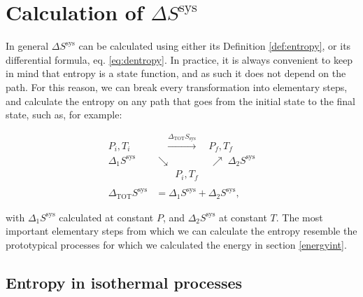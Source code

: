 \documentclass[
  9pt,
]{extbook}
\theoremstyle{definition}
\theoremstyle{definition}
\theoremstyle{definition}
\theoremstyle{remark}
\begin{document}
\hypertarget{dssys}{%
\section{\texorpdfstring{Calculation of \(\Delta S^{\mathrm{sys}}\)}{Calculation of \textbackslash Delta S\^{}\{\textbackslash mathrm\{sys\}\}}}\label{dssys}}

In general \(\Delta S^{\mathrm{sys}}\) can be calculated using either its Definition \ref{def:entropy}, or its differential formula, eq. \eqref{eq:dentropy}. In practice, it is always convenient to keep in mind that entropy is a state function, and as such it does not depend on the path. For this reason, we can break every transformation into elementary steps, and calculate the entropy on any path that goes from the initial state to the final state, such as, for example:

\begin{equation}
\begin{aligned}
P_i, T_i & \quad \xrightarrow{ \Delta_{\text{TOT}} S_{\text{sys}} } \quad P_f, T_f \\
  \scriptstyle{\Delta_1 S^{\text{sys}}} & \searrow \qquad  \qquad \nearrow \; \scriptstyle{\Delta_2 S^{\text{sys}}} \\
& \qquad P_i, T_f \\
\\
\Delta_{\text{TOT}} S^{\text{sys}} & = \Delta_1 S^{\text{sys}} + \Delta_2 S^{\text{sys}},
\end{aligned}
\label{eq:entropycycle}
\end{equation}

with \(\Delta_1 S^{\text{sys}}\) calculated at constant \(P\), and \(\Delta_2 S^{\text{sys}}\) at constant \(T\). The most important elementary steps from which we can calculate the entropy resemble the prototypical processes for which we calculated the energy in section \ref{energyint}.

\hypertarget{entropy-in-isothermal-processes}{%
\subsection{Entropy in isothermal processes}\label{entropy-in-isothermal-processes}}
\end{document}
